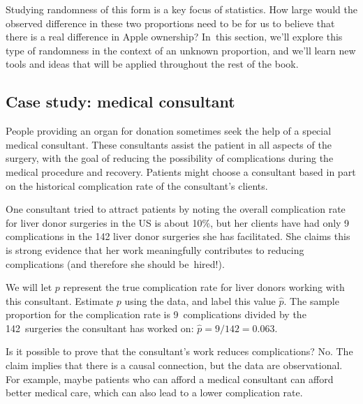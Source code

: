 Studying randomness of this form is a key focus of statistics. How large would the observed difference in these two proportions need to be for us to believe that there is a real difference in Apple ownership? In~this section, we'll explore this type of randomness in the context of an unknown proportion, and we'll learn new tools and ideas that will be applied throughout the rest of the book.

\subsection{Case study: medical consultant}

People providing an organ for donation sometimes seek the help of a special medical consultant. These consultants assist the patient in all aspects of the surgery, with the goal of reducing the possibility of complications during the medical procedure and recovery. Patients might choose a consultant based in part on the historical complication rate of the consultant's clients.

One consultant tried to attract patients by noting the overall complication rate for liver donor surgeries in the US is about 10\%, but her clients have had only 9 complications in the 142 liver donor surgeries she has facilitated. She claims this is strong evidence that her work meaningfully contributes to reducing complications (and therefore she should be~hired!).

\begin{example}{We will let $p$ represent the true complication rate for liver donors working with this consultant. Estimate $p$ using the data, and label this value $\hat{p}$.}
The sample proportion for the complication rate is 9~complications divided by the 142~surgeries the consultant has worked on: $\hat{p} = 9 / 142 = 0.063$.
\end{example}

\begin{example}{Is it possible to prove that the consultant's work reduces complications?}
No. The claim implies that there is a causal connection, but the data are observational. For example, maybe patients who can afford a medical consultant can afford better medical care, which can also lead to a lower complication rate.
\end{example}

